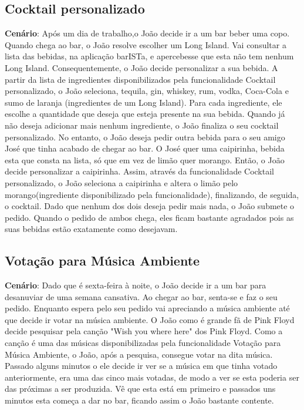 \documentclass{article}
\begin{document}
\subsection*{Cocktail personalizado}
\textbf{Cenário}: Após um dia de trabalho,o João decide ir a um bar beber uma copo. Quando chega ao bar, o João resolve  escolher um Long Island. Vai consultar a lista das bebidas, na aplicação barISTa, e apercebesse que esta não tem nenhum Long Island. Consequentemente, o João decide personalizar a sua bebida. A partir da lista de ingredientes disponibilizados pela funcionalidade Cocktail personalizado, o João seleciona, tequila, gin, whiskey, rum, vodka, Coca-Cola e sumo de laranja (ingredientes de um Long Island). Para cada ingrediente, ele escolhe a quantidade que deseja que esteja presente na sua bebida. Quando já não deseja adicionar mais nenhum ingrediente, o João finaliza o seu cocktail personalizado. No entanto, o João deseja pedir outra bebida para o seu amigo José que tinha acabado de chegar ao bar. O José quer uma caipirinha, bebida esta que consta na lista, só que em vez de limão quer morango. Então, o João decide personalizar a caipirinha. Assim, através da funcionalidade Cocktail personalizado, o João seleciona a caipirinha e altera o limão pelo morango(ingrediente disponibilizado pela funcionalidade), finalizando, de seguida, o cocktail. Dado que nenhum dos dois deseja pedir mais nada, o João submete o pedido. Quando o pedido de ambos chega, eles ficam bastante agradados pois as suas bebidas estão exatamente como desejavam.
\\

\subsection*{Votação para Música Ambiente}
\textbf{Cenário}: Dado que é sexta-feira à noite, o João decide ir a um bar para desanuviar de uma semana cansativa. Ao chegar ao bar, senta-se e faz o seu pedido. Enquanto espera pelo seu pedido vai apreciando a música ambiente até que decide ir votar na música ambiente. O João como é grande fã de Pink Floyd decide pesquisar pela canção "Wish you where here" dos Pink Floyd. Como a canção é uma das músicas disponibilizadas pela funcionalidade Votação para Música Ambiente, o João, após a pesquisa, consegue votar na dita música. Passado alguns minutos o ele decide ir ver se a música em que tinha votado anteriormente, era uma das cinco mais votadas, de modo a ver se esta poderia ser das próximas a ser produzida. Vê que esta está em primeiro e passados uns minutos esta começa a dar no bar, ficando assim o João bastante contente.
\end{document}
